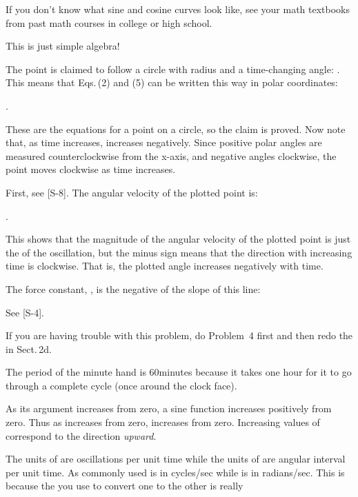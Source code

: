 {{If you don't know what sine and cosine curves look like, see your math
textbooks from past math courses in college or high school.
}

{
This is just simple algebra!
}

{
The point is claimed to follow a circle with radius  and a
time-changing angle: .
This means that Eqs.\,(2) and (5) can be written this way in polar coordinates:

 .

These are the equations for a point on a circle, so the claim is
proved.
Now note that, as time increases, \m{\theta} increases negatively.
Since positive polar angles are measured counterclockwise from the x-axis,
and negative angles clockwise, the point moves clockwise as time increases.
}

{
First, see [S-8].
The angular velocity of the plotted point is:

 .

This shows that the magnitude of the angular velocity of the plotted point is
just the \m{\omega} of the oscillation, but the minus sign means that the
direction with increasing time is clockwise.
That is, the plotted angle increases negatively with time.
}

{
The force constant, , is the negative of the slope of this line:
}

{
See [S-4].
}

{
If you are having trouble with this problem, do Problem~4 first
and then redo the  in Sect.\,2d.
}

{
The period of the minute hand is 60\unit{minutes} because it takes one hour
for it to go through a complete cycle (once around the clock face).
}

{
As its argument increases from zero, a sine function increases positively
from zero.
Thus as  increases from zero,  increases from zero.
Increasing values of  correspond to the direction {\em upward}.
}

{
The units of \m{\nu} are oscillations per unit time while the units of
\m{\omega} are angular interval per unit time.
As commonly used \m{\nu} is in cycles/sec while \m{\omega} is in radians/sec.
This is because the \Quote{2 \m{\pi}} you use to convert one to the other is
really 
}

}%

